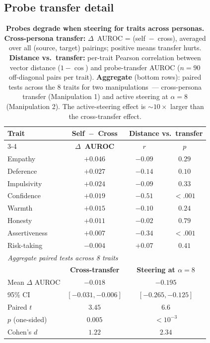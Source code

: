 \documentclass{article}
\theoremstyle{plain}
\theoremstyle{definition}
\theoremstyle{remark}
\begin{document}
\subsection{Probe transfer detail}
\label{app:probe_transfer}



 \begin{table}[h!]
     \centering
     \small
     \caption{\textbf{Probes degrade when steering for traits across personas.} \textbf{Cross-persona transfer:} $\Delta$~AUROC = (self~$-$~cross), averaged over all (source, target) pairings; positive means transfer hurts. \textbf{Distance vs.\ transfer:} per-trait Pearson correlation between vector distance ($1 - \cos$) and probe-transfer AUROC ($n = 90$ off-diagonal pairs per trait). \textbf{Aggregate} (bottom rows): paired tests across the 8 traits for two manipulations~--- cross-persona transfer (Manipulation 1) and active steering at $\alpha = 8$ (Manipulation 2). The active-steering effect is $\sim 10\times$ larger than the cross-transfer effect.}
     \label{tab:probe-stats}
     \begin{tabular}{lccc}
         \toprule
         \multirow{2}{*}{\textbf{Trait}} & \textbf{Self~$-$~Cross} & \multicolumn{2}{c}{\textbf{Distance vs.\ transfer}} \\
         \cmidrule(lr){3-4}
          & \textbf{$\Delta$~AUROC} & $r$ & $p$ \\
         \midrule
         Empathy        & $+0.046$ & $-0.09$ & $0.29$ \\
         Deference      & $+0.027$ & $-0.14$ & $0.10$ \\
         Impulsivity    & $+0.024$ & $-0.09$ & $0.33$ \\
         Confidence     & $+0.019$ & $-0.51$ & $<.001$ \\
         Warmth         & $+0.015$ & $-0.10$ & $0.24$ \\
         Honesty        & $+0.011$ & $-0.02$ & $0.79$ \\
         Assertiveness  & $+0.007$ & $-0.34$ & $<.001$ \\
         Risk-taking    & $-0.004$ & $+0.07$ & $0.41$ \\
         \midrule
         \multicolumn{4}{l}{\textit{Aggregate paired tests across 8 traits}} \\
         \midrule
          & \textbf{Cross-transfer} & \multicolumn{2}{c}{\textbf{Steering at $\alpha = 8$}} \\
         \midrule
         Mean $\Delta$ AUROC      & $-0.018$              & \multicolumn{2}{c}{$-0.195$} \\
         95\% CI                  & $[-0.031, -0.006]$    & \multicolumn{2}{c}{$[-0.265, -0.125]$} \\
         Paired $t$               & $3.45$                & \multicolumn{2}{c}{$6.6$} \\
         $p$ (one-sided)          & $0.005$               & \multicolumn{2}{c}{$<10^{-3}$} \\
         Cohen's $d$              & $1.22$                & \multicolumn{2}{c}{$2.34$} \\
         \bottomrule
     \end{tabular}
 \end{table}
\end{document}
